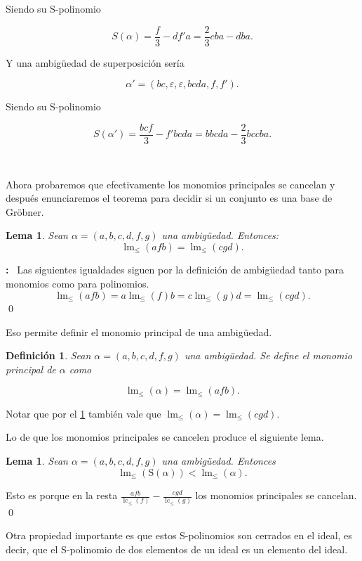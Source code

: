 \documentclass[12pt]{report}
\theoremstyle{customstyle}
\newtheorem{definition}[theorem]{Definición}
\newtheorem{lemma}[theorem]{Lema}
\renewenvironment{proof}[1][\proofname]{{\noindent \bfseries #1: }}{\qed} %
\theoremstyle{factstyle}
\DeclareMathOperator{\lm}{lm}
\DeclareMathOperator{\lc}{lc}
\renewcommand{\S}{\text{S}}
\begin{document}
\noindent Siendo su S-polinomio

\[S(α) = \frac{f}{3} - d f' a = \frac{2}{3} cba - dba  \text{.} \]

\noindent Y una ambigüedad de superposición sería

\[ α' = (bc, ε, ε, bcda, f, f') \text{.} \]

\noindent Siendo su S-polinomio

\[ S(α') = \frac{bc f}{3} - f' bcda = bbcda - \frac{2}{3} bccba \text{.} \]

\

Ahora probaremos que efectivamente los monomios principales se cancelan y después enunciaremos el teorema para decidir si un conjunto es una base de Gröbner.

\begin{lemma}\label{lemma:lm ambs}
  Sean $α = (a, b, c, d, f, g)$ una ambigüedad. Entonces:
  \[ \lm_≤{(afb)} = \lm_≤{(cgd)} \text{.}\]
\end{lemma}
\begin{proof}\
  Las siguientes igualdades siguen por la definición de ambigüedad tanto para monomios como para polinomios.
  \[ \lm_≤{(afb)} = a\lm_≤{(f)}b = c\lm_≤{(g)}d = \lm_≤{(cgd)} \text{.} \]
\end{proof}

Eso permite definir el monomio principal de una ambigüedad.

\begin{definition}
  Sean $α = (a, b, c, d, f, g)$ una ambigüedad. Se define el monomio principal de $α$ como

  \[ \lm_≤(α) = \lm_≤(afb) \text{.}\]
\end{definition}

Notar que por el \cref{lemma:lm ambs} también vale que $\lm_≤(α) = \lm_≤(cgd)$.

Lo de que los monomios principales se cancelen produce el siguiente lema.

\begin{lemma}
  Sean $α = (a, b, c, d, f, g)$ una ambigüedad. Entonces
  \[ \lm_≤(\S(α)) < \lm_≤(α) \text{.}\]
\end{lemma}
\begin{proof}
  Esto es porque en la resta $\frac{afb}{\lc_≤(f)} - \frac{cgd}{\lc_≤(g)}$ los monomios principales se cancelan.
\end{proof}

Otra propiedad importante es que estos S-polinomios son cerrados en el ideal, es decir, que el S-polinomio de dos elementos de un ideal es un elemento del ideal.
\end{document}
